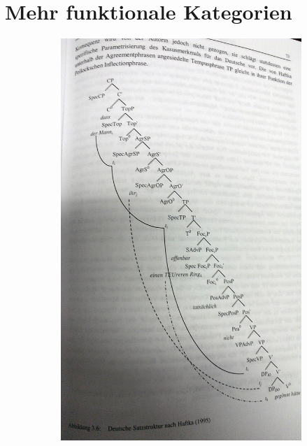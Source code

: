 \section{Mehr funktionale Kategorien}

\begin{frame}
\nocite{Lenerz93a}

\begin{figure}[b]
	\begin{minipage}[b]{0.48\textwidth}
	\begin{figure}					
		\includegraphics[scale=0.07]{material/Haftka95CP}

\end{figure}
\end{minipage}
\end{figure}
\end{frame}
